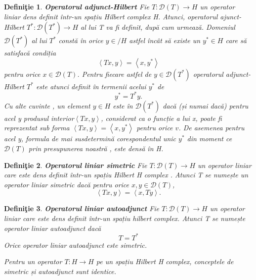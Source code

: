 \documentclass[a4paper,12pt,oneside]{report}
\newtheorem{definition}{Defini\c tie}
\begin{document}
\begin{definition} \textbf{Operatorul adjunct-Hilbert }
Fie \(T : \mathcal{D}\left ( T \right ) \rightarrow H\) un operator liniar dens definit într-un spațiu Hilbert complex H. Atunci, operatorul ajunct-Hilbert \(T^{\ast } : \mathcal{D}\left ( T^{\ast } \right ) \rightarrow H\) al lui T va fi definit, după cum urmează. Domeniul \(\mathcal{D}\left ( T^{\ast } \right )\) al lui \(T^{\ast }\) constă în orice \(y \in /H\) astfel încât să existe un \(y^{\ast } \in H\) care să satisfacă condiția
\begin{displaymath}
\left \langle Tx,y \right \rangle = \left \langle x,y^{\ast } \right \rangle
\end{displaymath}
pentru orice \(x \in \mathcal{D}\left ( T \right )\). Pentru fiecare astfel de \(y \in \mathcal{D}\left ( T^{\ast } \right )\) operatorul adjunct-Hilbert \(T^{\ast }\) este atunci definit în termenii acelui \(y^{\ast }\) de
\begin{displaymath}
y^{\ast } = T^{\ast }y.
\end{displaymath}
Cu alte cuvinte , un element \(y\in H\) este în \(\mathcal{D}\left ( T^{\ast } \right )\) dacă (și numai dacă) pentru acel y produsul interior\(\left \langle Tx,y \right \rangle \), considerat ca o funcție a lui x, poate fi reprezentat sub forma  \(\left \langle Tx,y \right \rangle = \left \langle x,y^{\ast } \right \rangle\) pentru orice \(v\). De asemenea pentru acel y, formula de mai susdetermină corespondentul unic \(y^{\ast }\) din moment ce \(\mathcal{D}\left ( T \right )\) prin presupunerea noastră , este densă în H.
\end{definition}
\begin{definition}\textbf{Operatorul liniar simetric }
Fie \(T :  \mathcal{D}\left ( T \right ) \rightarrow H\) un operator liniar care este dens definit într-un spațiu Hilbert H complex . Atunci T se numește un operator liniar simetric dacă pentru orice \(x,y\in \mathcal{D}\left ( T \right )\), 
\begin{displaymath}
\left \langle Tx,y \right \rangle = \left \langle x,Ty \right \rangle. 
\end{displaymath}
\end{definition}
\begin{definition}\textbf{Operatorul liniar autoadjunct}
Fie \(T :  \mathcal{D}\left ( T \right ) \rightarrow H \) un operator liniar care este dens definit într-un spațiu hilbert complex. Atunci T se numește operator liniar autoadjunct dacă
\begin{displaymath}
T = T^{\ast }
\end{displaymath}
Orice operator liniar autoadjunct este simetric. 

\noindent Pentru un operator \(T : H \rightarrow H\) pe un spațiu Hilbert H complex, conceptele de simetric și autoadjunct sunt identice. 
\end{definition}
\end{document}
